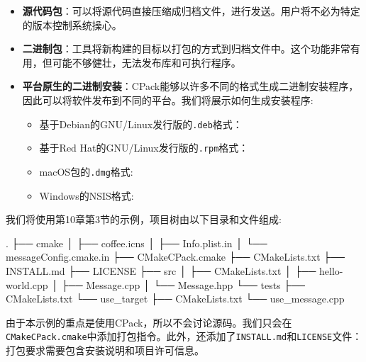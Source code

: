 \begin{itemize}
\item \textbf{源代码包}：可以将源代码直接压缩成归档文件，进行发送。用户将不必为特定的版本控制系统操心。

\item \textbf{二进制包}：工具将新构建的目标以打包的方式到归档文件中。这个功能非常有用，但可能不够健壮，无法发布库和可执行程序。

\item \textbf{平台原生的二进制安装}：CPack能够以许多不同的格式生成二进制安装程序，因此可以将软件发布到不同的平台。我们将展示如何生成安装程序:

\begin{itemize}
\item 基于Debian的GNU/Linux发行版的\texttt{.deb}格式： 

\item 基于Red Hat的GNU/Linux发行版的\texttt{.rpm}格式： 

\item macOS包的\texttt{.dmg}格式: 

\item Windows的NSIS格式: 

\end{itemize}

\end{itemize}


我们将使用第10章第3节的示例，项目树由以下目录和文件组成:

\begin{codebox}[shell]
.
├── cmake
│    ├── coffee.icns
│    ├── Info.plist.in
│    └── messageConfig.cmake.in
├── CMakeCPack.cmake
├── CMakeLists.txt
├── INSTALL.md
├── LICENSE
├── src
│    ├── CMakeLists.txt
│    ├── hello-world.cpp
│    ├── Message.cpp
│    └── Message.hpp
└── tests
    ├── CMakeLists.txt
    └── use_target
        ├── CMakeLists.txt
        └── use_message.cpp
\end{codebox}

由于本示例的重点是使用CPack，所以不会讨论源码。我们只会在\texttt{CMakeCPack.cmake}中添加打包指令。此外，还添加了\texttt{INSTALL.md}和\texttt{LICENSE}文件：打包要求需要包含安装说明和项目许可信息。

